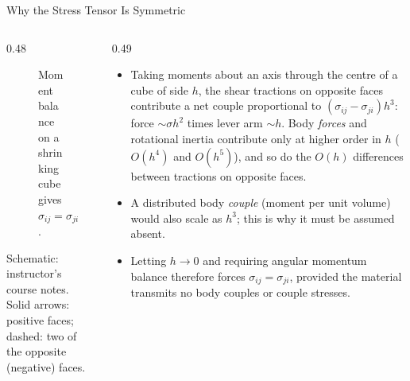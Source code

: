 \documentclass[aspectratio=169,11pt]{beamer}
\begin{document}
\begin{frame}{Why the Stress Tensor Is Symmetric}
\begin{columns}[c,onlytextwidth]
\begin{column}{0.48\textwidth}
\begin{figure}[h]
    \caption{Moment balance on a shrinking cube gives \(\sigma_{ij}=\sigma_{ji}\).}
\end{figure}
\vspace{-4mm}
{\centering\tiny\color{DarkGray}Schematic: instructor's course notes. Solid arrows: positive faces; dashed: two of the opposite (negative) faces.\par}
\end{column}
\begin{column}{0.49\textwidth}
\small
\begin{itemize}
  \item Taking moments about an axis through the centre of a cube of side \(h\), the shear tractions on opposite faces contribute a net couple proportional to \((\sigma_{ij}-\sigma_{ji})h^3\): force \(\sim \sigma h^2\) times lever arm \(\sim h\). Body \emph{forces} and rotational inertia contribute only at higher order in \(h\) (\(O(h^4)\) and \(O(h^5)\)), and so do the \(O(h)\) differences between tractions on opposite faces.
  \item A distributed body \emph{couple} (moment per unit volume) would also scale as \(h^3\); this is why it must be assumed absent.
  \item Letting \(h \to 0\) and requiring angular momentum balance therefore forces \(\sigma_{ij}=\sigma_{ji}\), provided the material transmits no body couples or couple stresses.
\end{itemize}
\end{column}
\end{columns}

\end{frame}
\end{document}
